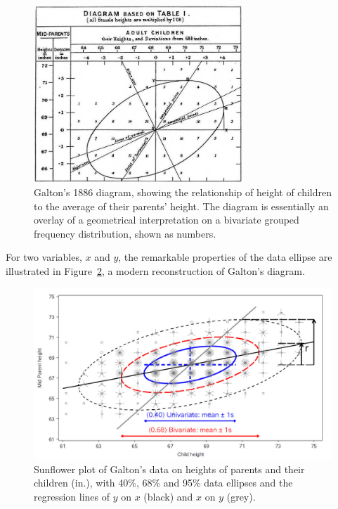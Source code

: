 \documentclass[
  letterpaper,
  10pt,
  krantz2]{krantz}
\begin{document}
\begin{figure}

{\centering \includegraphics[width=0.7\textwidth,height=\textheight]{images/galton-corr.jpg}

}

\caption{\label{fig-galton-corr}Galton's 1886 diagram, showing the
relationship of height of children to the average of their parents'
height. The diagram is essentially an overlay of a geometrical
interpretation on a bivariate grouped frequency distribution, shown as
numbers.}

\end{figure}

For two variables, \(x\) and \(y\), the remarkable properties of the
data ellipse are illustrated in Figure~\ref{fig-galton-ellipse-r}, a
modern reconstruction of Galton's diagram.

\begin{figure}

{\centering \includegraphics[width=1\textwidth,height=\textheight]{images/galton-ellipse-r.jpg}

}

\caption{\label{fig-galton-ellipse-r}Sunflower plot of Galton's data on
heights of parents and their children (in.), with 40\%, 68\% and 95\%
data ellipses and the regression lines of \(y\) on \(x\) (black) and
\(x\) on \(y\) (grey).}

\end{figure}
\end{document}
